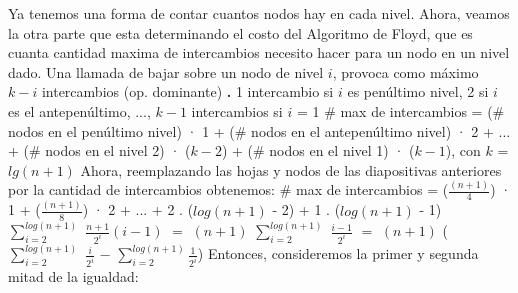 \documentclass[10pt,a4paper]{article}
\begin{document}
\newline
\newline
Ya tenemos una forma de contar cuantos nodos hay en cada nivel. Ahora, veamos la otra parte que esta determinando el costo del Algoritmo de Floyd, que es cuanta cantidad maxima de intercambios necesito hacer para un nodo en un nivel dado. 
\newline
\newline
Una llamada de bajar sobre un nodo de nivel $i$, provoca como máximo $k - i$ intercambios (op. dominante) 
\newline
\newline
\textbf{.} 1 intercambio si $i$ es penúltimo nivel, 2 si $i$ es el antepenúltimo, ..., $k-1$ intercambios si $i$ = 1
\newline
\newline
\# max de intercambios = 
\newline
\newline
(\# nodos en el penúltimo nivel) · 1 + (\# nodos en el antepenúltimo nivel) · 2 + ... + (\# nodos en el nivel 2) · ($k-2$) + 
\newline
\newline
(\# nodos en el nivel 1) · ($k-1$), con $k$ = $lg(n+1)$
\newline
\newline
\newline
\newline
\newline
Ahora, reemplazando las hojas y nodos de las diapositivas anteriores por la cantidad de intercambios obtenemos:
\newline
\newline
\# max de intercambios = 
\newline
\newline
($\displaystyle \frac{(n+1)}{4}$) · 1 + ($\displaystyle \frac{(n+1)}{8}$) · 2 + ... + 2 . ($log(n+1)$ - 2) + 1 . ($log(n+1)$ - 1) 
\newline
\newline
\newline
$\displaystyle \sum_{i=2}^{log(n+1)}$ $\displaystyle \frac{n+1}{2^{i}}(i-1)$ $=$ $(n+1)$ $\displaystyle \sum_{i=2}^{log(n+1)}$ $\displaystyle \frac{i-1}{2^{i}}$ $=$ $(n+1)$ ($\displaystyle \sum_{i=2}^{log(n+1)}$ $\displaystyle \frac{i}{2^{i}}$ $-$ $\displaystyle \sum_{i=2}^{log(n+1)} \displaystyle \frac{1}{2^{i}}$) 
\newline
\newline
\newline
Entonces, consideremos la primer y segunda mitad de la igualdad:
\end{document}
